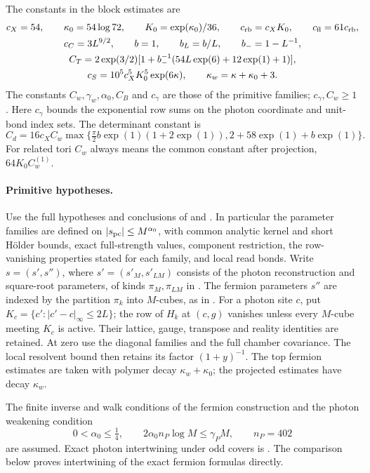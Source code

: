 The constants in the block estimates are
\[
 \begin{gathered}
 c_X=54,\qquad \kappa_0=54\log72,\qquad K_0=\exp(\kappa_0)/36,\qquad
 c_{\rm rb}=c_XK_0,\qquad c_{\rm fl}=61c_{\rm rb},\\
 c_C=3L^{9/2},\qquad b=1,\qquad b_L=b/L,\qquad b_-=1-L^{-1},\\
 C_T=2\exp(3/2)
       [1+b_-^{-1}(54L\exp(6)+12\exp(1)+1)],\\
 c_S=10^5c_X^5K_0^5\exp(6\kappa),\qquad
 \kappa_w=\kappa+\kappa_0+3.
 \end{gathered}
\]
The constants \(C_w,\gamma_w,\alpha_0,C_B\) and \(c_\gamma\) are those
of the primitive families; \(c_\gamma,C_w\ge1\).
Here \(c_\gamma\) bounds the exponential row sums on the photon
coordinate and unit-bond index sets. The determinant constant is
\[
 C_d=16c_XC_w\max\{\tfrac\pi2 b\exp(1)(1+2\exp(1)),
                         2+58\exp(1)+b\exp(1)\}.
\]
For related tori \(C_w\) always means the common constant after
projection, \(64K_0C_w^{(1)}\).

\paragraph{Primitive hypotheses.}
Use the full hypotheses and conclusions of
\cite[Theorems A--B and Proposition 5.1]{MaxwellBlockManuscript}
and \cite[Theorem A and Propositions 4.1--4.3]{FermionBlockManuscript}.
In particular the parameter families are defined on
\(|s_{\rm pc}|\le M^{\alpha_0}\), with common analytic kernel and
short H\"older bounds, exact full-strength values, component
restriction, the row-vanishing properties stated for each family,
and local read bonds.
Write $s=(s',s'')$, where $s'=(s'_M,s'_{LM})$ consists of
the photon reconstruction and square-root parameters, of kinds
$\pi_M,\pi_{LM}$ in \cite[(37)]{MaxwellBlockManuscript}.
The fermion parameters $s''$ are indexed by the partition
$\pi_k$ into $M$-cubes, as in
\cite[\S4.1]{FermionBlockManuscript}.
For a photon site $c$, put
$K_c=\{c':|c'-c|_\infty\le2L\}$; the row of $H_k$ at $(c,g)$
vanishes unless every $M$-cube meeting $K_c$ is active.
Their lattice, gauge, transpose and reality identities are retained.
At zero use the diagonal families and the full chamber covariance.
The local resolvent bound then retains its factor \((1+y)^{-1}\).
The top fermion estimates are taken with polymer decay
\(\kappa_w+\kappa_0\); the projected estimates have decay \(\kappa_w\).

The finite inverse and walk conditions of the fermion construction
and the photon weakening condition
\[
 0<\alpha_0\le\tfrac14,\qquad
 2\alpha_0 n_P\log M\le\gamma_PM,\qquad n_P=402
\]
are assumed. Exact photon intertwining under odd covers is
\cite[(46)]{MaxwellBlockManuscript}. The comparison below proves
intertwining of the exact fermion formulas directly.

